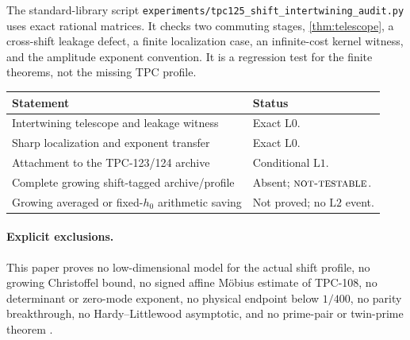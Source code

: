 \documentclass[11pt]{article}
\theoremstyle{definition}
\theoremstyle{remark}
\newcommand{\Lzero}{\mathrm{L0}}
\newcommand{\Lone}{\mathrm{L1}}
\newcommand{\Ltwo}{\mathrm{L2}}
\newcommand{\NT}{\textsc{not-testable}}
\begin{document}
The standard-library script
\texttt{experiments/tpc125\_shift\_intertwining\_audit.py} uses exact
rational matrices.  It checks two commuting stages,
\cref{thm:telescope}, a cross-shift leakage defect, a finite
localization case, an infinite-cost kernel witness, and the amplitude
exponent convention.  It is a regression test for the finite
theorems, not the missing TPC profile.

\begin{center}
\small
\begin{tabularx}{\textwidth}{@{}P{0.42\textwidth}Y@{}}
\toprule
Statement & Status\\
\midrule
Intertwining telescope and leakage witness
& Exact \(\Lzero\).\\
Sharp localization and exponent transfer
& Exact \(\Lzero\).\\
Attachment to the TPC-123/124 archive
& Conditional \(\Lone\).\\
Complete growing shift-tagged archive/profile
& Absent; \(\NT\).\\
Growing averaged or fixed-\(h_0\) arithmetic saving
& Not proved; no \(\Ltwo\) event.\\
\bottomrule
\end{tabularx}
\end{center}

\paragraph{Explicit exclusions.}
This paper proves no low-dimensional model for the actual shift
profile, no growing Christoffel bound, no signed affine M\"obius
estimate of TPC-108, no determinant or zero-mode exponent, no
physical endpoint below \(1/400\), no parity breakthrough, no
Hardy--Littlewood asymptotic, and no prime-pair or twin-prime theorem
\citep{WangTPC108,WangTPC120}.

\begingroup
\small
\setlength{\bibsep}{2pt plus 0.3ex}
\sloppy


\endgroup
\end{document}
